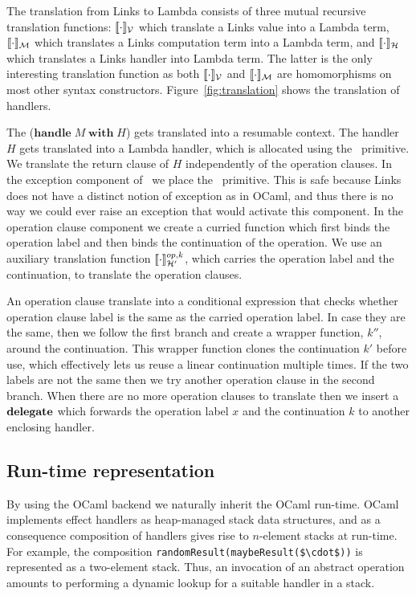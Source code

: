 \documentclass[12pt,mscres,cdtppar,twoside,openright,logo,rightchapter,normalheadings]{infthesis}
\theoremstyle{definition}
\newcommand{\keyw}[1]{\textbf{#1}}
\newcommand{\Handle}{\keyw{handle}}
\newcommand{\With}{\keyw{with}}
\begin{document}
The translation from Links to Lambda consists of three mutual
recursive translation functions: $\llbracket \cdot \rrbracket_\mathcal{V}$ which translate a
Links value into a Lambda term, $\llbracket \cdot \rrbracket_\mathcal{M}$ which translates a
Links computation term into a Lambda term, and $\llbracket \cdot \rrbracket_\mathcal{H}$ which
translates a Links handler into Lambda term. The latter is the only
interesting translation function as both $\llbracket \cdot \rrbracket_\mathcal{V}$ and
$\llbracket \cdot \rrbracket_\mathcal{M}$ are homomorphisms on most other syntax constructors.
Figure~\ref{fig:translation} shows the translation of handlers.

The ($\Handle\; M \; \With\; H$) gets translated into a resumable
context. The handler $H$ gets translated into a Lambda handler, which
is allocated using the \Alloc\ primitive. We translate the
return clause of $H$ independently of the operation clauses. In the
exception component of \Alloc\ we place the \Error\ primitive. This is
safe because Links does not have a distinct notion of exception as in
OCaml, and thus there is no way we could ever raise an exception that
would activate this component. In the operation clause component we
create a curried function which first binds the operation label and
then binds the continuation of the operation. We use an auxiliary
translation function $\llbracket \cdot \rrbracket_{\mathcal{H}'}^{op,k}$, which carries the
operation label and the continuation, to translate the operation
clauses.

An operation clause translate into a conditional expression that
checks whether operation clause label is the same as the carried
operation label. In case they are the same, then we follow the first
branch and create a wrapper function, $k''$, around the
continuation. This wrapper function clones the continuation $k'$
before use, which effectively lets us reuse a linear continuation
multiple times. If the two labels are not the same then we try another
operation clause in the second branch. When there are no more
operation clauses to translate then we insert a $\Delegate$ which
forwards the operation label $x$ and the continuation $k$ to another
enclosing handler.

\subsection{Run-time representation}
By using the OCaml backend we naturally inherit the OCaml
run-time. OCaml implements effect handlers as heap-managed stack data
structures, and as a consequence composition of handlers gives rise to
$n$-element stacks at run-time. For example, the composition
\lstinline[mathescape]!randomResult(maybeResult($\cdot$))! is
represented as a two-element stack. Thus, an invocation of an abstract
operation amounts to performing a dynamic lookup for a suitable
handler in a stack.
\end{document}
